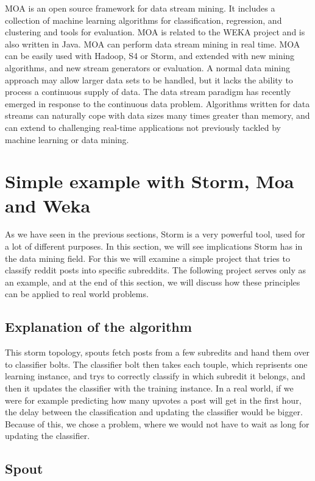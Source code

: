 \documentclass[journal]{IEEEtran/IEEEtran}
\begin{document}
MOA is an open source framework for data stream mining. It includes a collection of machine learning algorithms for classification, regression, and clustering and tools for evaluation. MOA is related to the WEKA project and is also written in Java. MOA can perform data stream mining in real time. MOA can be easily used with Hadoop, S4 or Storm, and extended with new mining algorithms, and new stream generators or evaluation. A normal data mining approach may allow larger data sets to be handled, but it lacks the ability to process a continuous supply of data. The data stream paradigm has recently emerged in response to the continuous data problem. Algorithms written for data streams can naturally cope with data sizes many times greater than memory, and can extend to challenging real-time applications not previously tackled by machine learning or data mining.

\section{Simple example with Storm, Moa and Weka}

As we have seen in the previous sections, Storm is a very powerful tool, used for a lot of different purposes. In this section, we will see implications Storm has in the data mining field. For this we will examine a simple project that tries to classify reddit posts into specific subreddits. The following project serves only as an example, and at the end of this section, we will discuss how these principles can be applied to real world problems.

\subsection{Explanation of the algorithm}

This storm topology, spouts fetch posts from a few subredits and hand them over to classifier bolts. The classifier bolt then takes each touple, which reprisents one learning instance, and trys to correctly classify in which subredit it belongs, and then it updates the classifier with the training instance. In a real world, if we were for example predicting how many upvotes a post will get in the first hour, the delay between the classification and updating the classifier would be bigger. Because of this, we chose a problem, where we would not have to wait as long for updating the classifier. 

\subsection{Spout}
\end{document}
